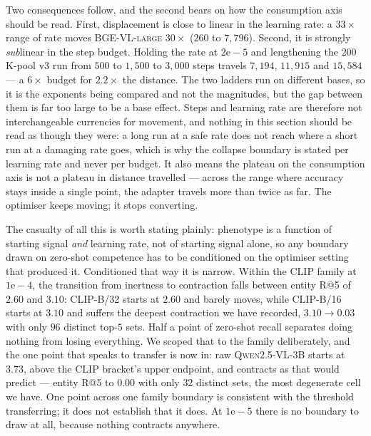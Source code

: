 Two consequences follow, and the second bears on how the consumption axis should be read. First,
displacement is close to linear in the learning rate: a $33\times$ range of rate moves
\textsc{BGE-VL-large} $30\times$ ($260$ to $7{,}796$). Second, it is strongly \emph{sub}linear in
the step budget. Holding the rate at $2\mathrm{e}{-}5$ and lengthening the $200$K-pool v3 run from
$500$ to $1{,}500$ to $3{,}000$ steps travels $7{,}194$, $11{,}915$ and $15{,}584$ --- a $6\times$
budget for $2.2\times$ the distance. The two ladders run on different bases, so it is the exponents
being compared and not the magnitudes, but the gap between them is far too large to be a base
effect. Steps and learning rate are therefore not interchangeable currencies for movement, and
nothing in this section should be read as though they were: a long run at a safe rate does not
reach where a short run at a damaging rate goes, which is why the collapse boundary is stated per
learning rate and never per budget. It also means the plateau on the consumption axis is not a
plateau in distance travelled --- across the range where accuracy stays inside a single point, the
adapter travels more than twice as far. The optimiser keeps moving; it stops converting.

The casualty of all this is worth stating plainly: phenotype is a function of starting signal
\emph{and} learning rate, not of starting signal alone, so any boundary drawn on zero-shot
competence has to be conditioned on the optimiser setting that produced it. Conditioned that way it is narrow.
Within the CLIP family at $1\mathrm{e}{-}4$, the transition from inertness to contraction falls
between entity R@5 of $2.60$ and $3.10$: \textsc{CLIP-B/32} starts at $2.60$ and barely moves,
while \textsc{CLIP-B/16} starts at $3.10$ and suffers the deepest contraction we have recorded,
$3.10 \to 0.03$ with only $96$ distinct top-$5$ sets. Half a point of zero-shot recall separates
doing nothing from losing everything. We scoped that to the family deliberately, and the one point
that speaks to transfer is now in: raw \textsc{Qwen2.5-VL-3B} starts at $3.73$, above the CLIP
bracket's upper endpoint, and contracts as that would predict --- entity R@5 to $0.00$ with only
$32$ distinct sets, the most degenerate cell we have. One point across one family boundary is
consistent with the threshold transferring; it does not establish that it does. At $1\mathrm{e}{-}5$ there is no boundary to draw at all, because nothing contracts
anywhere.

